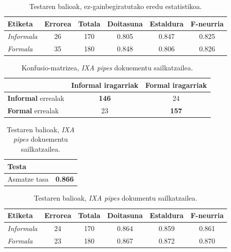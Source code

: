 \documentclass[information,article,submit,moreauthors,pdftex,10pt,a4paper]{Definitions/mdpi}
\begin{document}
\begin{table}[H]
  \centering
  \begin{tabular}{|l|c|c|c|c|c|}
    \hline
    \textbf{Etiketa} &  \textbf{Errorea} & \textbf{Totala} & \textbf{Doitasuna} & \textbf{Estaldura} & \textbf{F-neurria}\\ \hline 
    \textit{Informala} & 26 & 170 & 0.805  & 0.847  & 0.825\\ \hline 
    \textit{Formala} & 35 & 180 & 0.848 & 0.806 & 0.826\\ \hline
  \end{tabular}
  \caption{Testaren balioak, ez-gainbegiratutako eredu estatistikoa.}
  \label{tab:ez-gain ema}
\end{table}



\begin{table}[H]
  \centering
  \begin{tabular}{|l|c|c|}
    \hline  
    & \textbf{Informal} iragarriak & \textbf{Formal} iragarriak \\ \hline 
    \textbf{Informal} errealak & \textbf{146} & 24\\ \hline
    \textbf{Formal} errealak & 23 & \textbf{157}\\ \hline
  \end{tabular}
  \caption{Konfusio-matrizea, \textit{IXA pipes} dokuementu sailkatzailea.}
  \label{tab:ixa-ml-cm}
\end{table}

\begin{table}[H]
  \centering
  \begin{tabular}{|l|r|}
    \hline
    \textbf{Testa} &  \\ \hline 
    Asmatze tasa & \textbf{0.866} \\ \hline
  \end{tabular}
  \caption{Testaren balioak, \textit{IXA pipes} dokuementu sailkatzailea.}
  \label{tab:Test ixa}
\end{table}

\begin{table}[H]
  \centering
  \begin{tabular}{|l|c|c|c|c|c|}
    \hline
    \textbf{Etiketa} & \textbf{Errorea} & \textbf{Totala} & \textbf{Doitasuna} & \textbf{Estaldura} & \textbf{F-neurria}\\ \hline 
    \textit{Informala} &  24 & 170 & 0.864  & 0.859  & 0.861\\ \hline 
    \textit{Formala} &  23 & 180 & 0.867 & 0.872 & 0.870\\ \hline
  \end{tabular}
  \caption{Testaren balioak, \textit{IXA pipes} dokumentu sailkatzailea.}
  \label{tab:ixa-ml-test}
\end{table}
\end{document}
